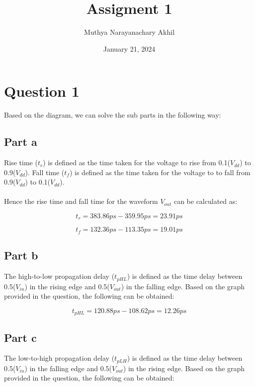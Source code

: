 \documentclass{article}
\title{Assigment 1}
\author{Muthya Narayanachary Akhil}
\date{January 21, 2024}
\begin{document}
\maketitle
\section*{Question 1}
Based on the diagram, we can solve the sub parts in the following way:

\subsection*{Part a}

Rise time ($t_{r}$) is defined as the time taken for the voltage to rise from 0.1($V_{dd}$) to 0.9($V_{dd}$).
Fall time ($t_{f}$) is defined as the time taken for the voltage to to fall from 0.9($V_{dd}$) to 0.1($V_{dd}$).
\\\\Hence the rise time and fall time for the waveform $V_{out}$ can be calculated as:

\begin{equation}
    t_{r} = 383.86ps - 359.95ps = 23.91ps
\end{equation}

\begin{equation}
    t_{f} = 132.36ps - 113.35ps = 19.01ps
\end{equation}

\subsection*{Part b}
The high-to-low propagation delay ($t_{pHL}$) is defined as the time delay between 0.5($V_{in}$) in the rising edge and 0.5($V_{out}$) in the falling edge.
Based on the graph provided in the question, the following can be obtained:

\begin{equation}
    t_{pHL} = 120.88ps - 108.62ps = 12.26ps
\end{equation}

\subsection*{Part c}
The low-to-high propagation delay ($t_{pLH}$) is defined as the time delay between 0.5($V_{in}$) in the falling edge and 0.5($V_{out}$) in the rising edge.
Based on the graph provided in the question, the following can be obtained:
\end{document}
